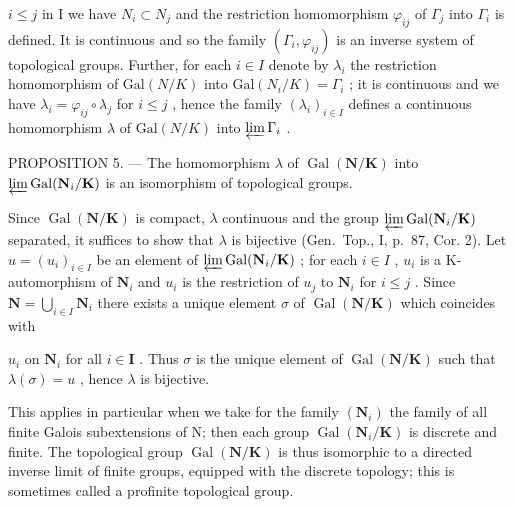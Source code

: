\(i \leqslant j\) in I we have \(N_i \subset N_j\) and the restriction homomorphism \(\varphi_{ij}\) of \(\Gamma_j\) into \(\Gamma_i\) is defined. It is continuous and so the family \((\Gamma_i, \varphi_{ij})\) is an inverse system of topological groups. Further, for each \(i \in I\) denote by \(\lambda_i\) the restriction homomorphism of \(\text{Gal}(N/K)\) into \(\text{Gal}(N_i/K) = \Gamma_i\) ; it is continuous and we have \(\lambda_i = \varphi_{ij} \circ \lambda_j\) for \(i \leqslant j\) , hence the family \((\lambda_i)_{i \in I}\) defines a continuous homomorphism \(\lambda\) of \(\text{Gal}(N/K)\) into \(\varprojlim \Gamma_i\) .

PROPOSITION 5. --- The homomorphism \(\lambda\) of \(\operatorname{Gal}(\mathbf{N}/\mathbf{K})\) into \(\varprojlim \operatorname{Gal}(\mathbf{N}_i/\mathbf{K})\) is an isomorphism of topological groups.

Since \(\operatorname{Gal}(\mathbf{N}/\mathbf{K})\) is compact, \(\lambda\) continuous and the group \(\varprojlim \operatorname{Gal}(\mathbf{N}_i/\mathbf{K})\) separated, it suffices to show that \(\lambda\) is bijective (Gen.~Top., I, p.~87, Cor. 2). Let \(u = (u_i)_{i \in I}\) be an element of \(\varprojlim \operatorname{Gal}(\mathbf{N}_i/\mathbf{K})\) ; for each \(i \in I\) , \(u_i\) is a K-automorphism of \(\mathbf{N}_i\) and \(u_i\) is the restriction of \(u_j\) to \(\mathbf{N}_i\) for \(i \leqslant j\) . Since \(\mathbf{N} = \bigcup_{i \in I} \mathbf{N}_i\) there exists a unique element \(\sigma\) of \(\operatorname{Gal}(\mathbf{N}/\mathbf{K})\) which coincides with

\(u_{i}\) on \(\mathbf{N}_i\) for all \(i\in \mathbf{I}\) . Thus \(\sigma\) is the unique element of \(\operatorname {Gal}(\mathbf{N} / \mathbf{K})\) such that \(\lambda (\sigma) = u\) , hence \(\lambda\) is bijective.

This applies in particular when we take for the family \((\mathbf{N}_{i})\) the family of all finite Galois subextensions of N; then each group \(\operatorname{Gal}(\mathbf{N}_{i}/\mathbf{K})\) is discrete and finite. The topological group \(\operatorname{Gal}(\mathbf{N}/\mathbf{K})\) is thus isomorphic to a directed inverse limit of finite groups, equipped with the discrete topology; this is sometimes called a profinite topological group.

